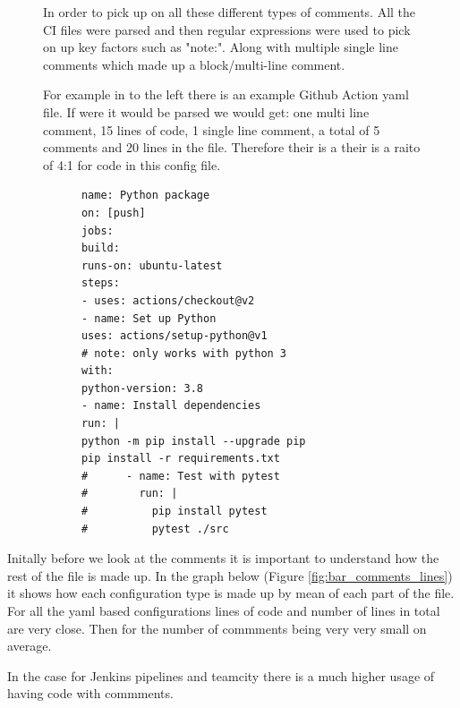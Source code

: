 \documentclass[twoside,12pt,titlepage,a4paper]{article}
\begin{document}
\begin{figure}[!htbp]
  \centering
  \begin{minipage}[t]{.48\textwidth}
    In order to pick up on all these different types of comments. All the CI files were parsed and then regular expressions were used to pick on up key factors such as "note:". Along with multiple single line comments which made up a block/multi-line comment.
    
    For example in to the left there is an example Github Action yaml file. If were it would be parsed we would get: one multi line comment, 15 lines of code, 1 single line comment, a total of 5 comments and 20 lines in the file. Therefore their is a their is a raito of 4:1 for code in this config file.
  \end{minipage}%
  \hfill
  \begin{minipage}[t]{.48\textwidth}
    \begin{verbatim}
      name: Python package
      on: [push]
      jobs:
      build:
      runs-on: ubuntu-latest
      steps:
      - uses: actions/checkout@v2
      - name: Set up Python
      uses: actions/setup-python@v1
      # note: only works with python 3
      with:
      python-version: 3.8
      - name: Install dependencies
      run: |
      python -m pip install --upgrade pip
      pip install -r requirements.txt
      #      - name: Test with pytest
      #        run: |
      #          pip install pytest
      #          pytest ./src
    \end{verbatim}
  \end{minipage}
\end{figure}


Initally before we look at the comments it is important to understand how the rest of the file is made up. In the graph below (Figure \ref{fig:bar_comments_lines}) it shows how each configuration type is made up by mean of each part of the file. For all the yaml based configurations lines of code and number of lines in total are very close. Then for the number of commments being very very small on average.

In the case for Jenkins pipelines and teamcity there is a much higher usage of having code with commments. 
\end{document}
